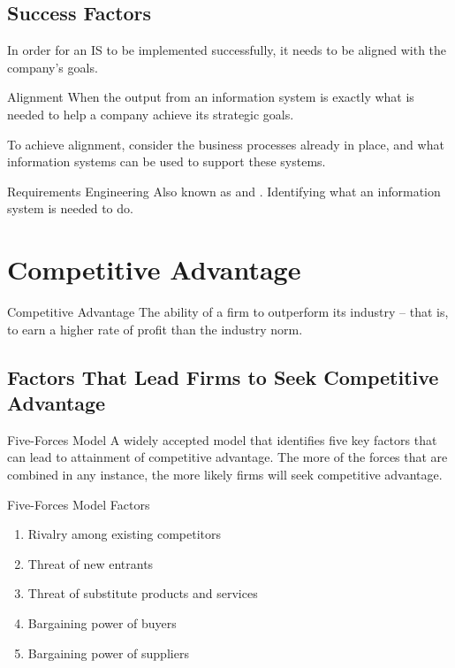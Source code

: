 \documentclass[\main/notes.tex]{subfiles}
\begin{document}
			\subsection{Success Factors}
				In order for an IS to be implemented successfully, it needs to be aligned with the company's goals.
				\begin{definition}{Alignment}
					When the output from an information system is exactly what is needed to help a company achieve its strategic goals.

					To achieve alignment, consider the business processes already in place, and what information systems can be used to support these systems.
				\end{definition}
				\begin{definition}{Requirements Engineering}
					Also known as  and . Identifying what an information system is needed to do.
				\end{definition}

		\section{Competitive Advantage}
			\begin{definition}{Competitive Advantage}
				The ability of a firm to outperform its industry -- that is, to earn a higher rate of profit than the industry norm.
			\end{definition}
			\subsection[Competitive Advantage Causes]{Factors That Lead Firms to Seek Competitive Advantage}
				\begin{definition}{Five-Forces Model}
					A widely accepted model that identifies five key factors that can lead to attainment of competitive advantage. The more of the forces that are combined in any instance, the more likely firms will seek competitive advantage.
				\end{definition}
				\begin{sidenote}{Five-Forces Model Factors}
					\begin{enumerate}
						\item Rivalry among existing competitors
						\item Threat of new entrants
						\item Threat of substitute products and services
						\item Bargaining power of buyers
						\item Bargaining power of suppliers
					\end{enumerate}
				\end{sidenote}
\end{document}
